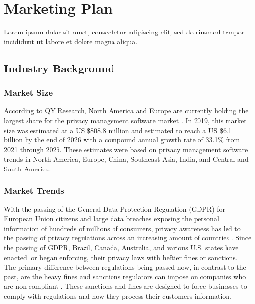 {\let\cleardoublepage\relax \chapter{Marketing Plan}}


Lorem ipsum dolor sit amet, consectetur adipiscing elit, sed do eiusmod tempor incididunt ut labore et dolore magna aliqua.


\section{Industry Background}

\subsection{Market Size} \label{market.size}

According to QY Research, North America and Europe are currently holding the largest share for the privacy management software market \cite{qy.2020}. In 2019, this market size was estimated at a US \$808.8 million and estimated to reach a US \$6.1 billion by the end of 2026 with a compound annual growth rate of 33.1\% from 2021 through 2026. These estimates were based on privacy management software trends in North America, Europe, China, Southeast Asia, India, and Central and South America.

\subsection{Market Trends} \label{marketing.trends}

With the passing of the General Data Protection Regulation (GDPR) for European Union citizens and large data breaches exposing the personal information of hundreds of millions of consumers, privacy awareness has led to the passing of privacy regulations across an increasing amount of countries \cite{privacypolicies.2019}. Since the passing of GDPR, Brazil, Canada, Australia, and various U.S. states have enacted, or began enforcing, their privacy laws with heftier fines or sanctions. The primary difference between regulations being passed now, in contrast to the past, are the heavy fines and sanctions regulators can impose on companies who are non-compliant \cite{tr.2020}. These sanctions and fines are designed to force businesses to comply with regulations and how they process their customers information.

